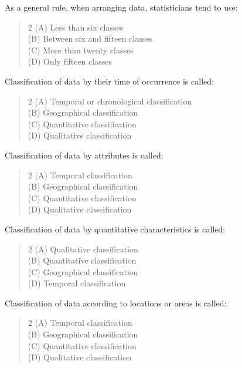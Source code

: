 \documentclass[11pt,a4paper]{article}
\begin{document}
\begin{mcqlist}
\item As a general rule, when arranging data, statisticians tend to use:
\begin{quote}\begin{multicols}{2}
\noindent (A) Less than six classes \\
(B) Between six and fifteen classes \\
(C) More than twenty classes \\
(D) Only fifteen classes
\end{multicols}\end{quote}

\item Classification of data by their time of occurrence is called:
\begin{quote}\begin{multicols}{2}
\noindent (A) Temporal or chronological classification \\
(B) Geographical classification \\
(C) Quantitative classification \\
(D) Qualitative classification
\end{multicols}\end{quote}

\item Classification of data by attributes is called:
\begin{quote}\begin{multicols}{2}
\noindent (A) Temporal classification \\
(B) Geographical classification \\
(C) Quantitative classification \\
(D) Qualitative classification
\end{multicols}\end{quote}

\item Classification of data by quantitative characteristics is called:
\begin{quote}\begin{multicols}{2}
\noindent (A) Qualitative classification \\
(B) Quantitative classification \\
(C) Geographical classification \\
(D) Temporal classification
\end{multicols}\end{quote}

\item Classification of data according to locations or areas is called:
\begin{quote}\begin{multicols}{2}
\noindent (A) Temporal classification \\
(B) Geographical classification \\
(C) Quantitative classification \\
(D) Qualitative classification
\end{multicols}\end{quote}


\end{mcqlist}
\end{document}
